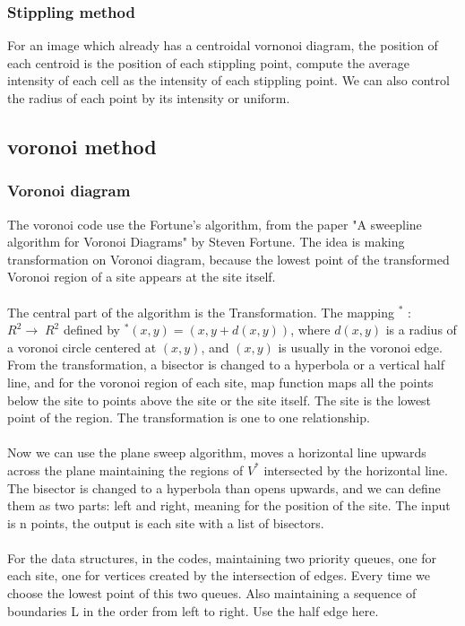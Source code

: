 \documentclass[11pt]{article}
\begin{document}
\subsubsection{Stippling method}
For an image which already has a centroidal vornonoi diagram, the position of each centroid is the position of each stippling point, compute the average intensity of each cell as the intensity of each stippling point. We can also control the radius of each point by its intensity or uniform.

\subsection{voronoi method}
\subsubsection{Voronoi diagram}
The voronoi code use the Fortune's algorithm\cite{fortune1987sweepline}, from the paper "A sweepline algorithm for Voronoi Diagrams" by Steven Fortune. The idea is making transformation on Voronoi diagram, because the lowest point of the transformed Voronoi region of a site appears at the site itself.
\\\\The central part of the algorithm is the Transformation. The mapping $^*$ : $R^2\to\;R^2$ defined by $^*(x,y)=(x,y+d(x,y))$, where $d(x,y)$ is a radius of a voronoi circle centered at $(x,y)$, and $(x,y)$ is usually in the voronoi edge. From the transformation, a bisector is changed to a hyperbola or a vertical half line, and for the voronoi region of each site, map function maps all the points below the site to points above the site or the site itself. The site is the lowest point of the region. The transformation is one to one relationship. 
\\\\Now we can use the plane sweep algorithm, moves a horizontal line upwards across the plane maintaining the regions of $V^*$ intersected by the horizontal line. The bisector is changed to a hyperbola than opens upwards, and we can define them as two parts: left and right, meaning for the position of the site. The input is n points, the output is each site with a list of bisectors.
\\\\For the data structures, in the codes, maintaining two priority queues, one for each site, one for vertices created by the intersection of edges. Every time we choose the lowest point of this two queues.
Also maintaining a sequence of boundaries L in the order from left to right. Use the half edge here.
\end{document}
